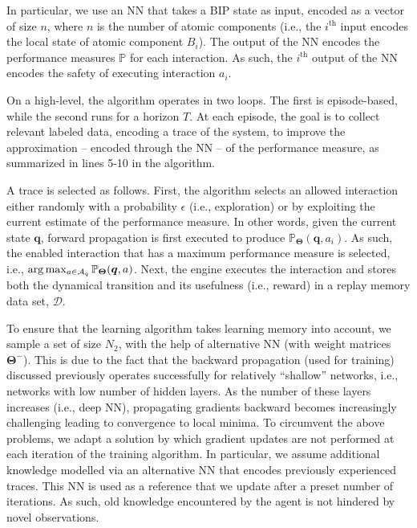 In particular, we use an NN that takes a BIP state as input, encoded as a vector of size $n$, where $n$ is the number of atomic components (i.e., the $i^{\text{th}}$ input encodes the local state of atomic component $B_i$). The output of the NN encodes the performance measures $\mathbb{P}$ for each interaction. As such, the $i^{\text{th}}$ output of the NN encodes the safety of executing interaction $a_i$.  

On a high-level, the algorithm operates in two loops. The first is episode-based, while the second runs for a horizon $T$. At each episode, the goal is to collect relevant labeled data, encoding a trace of the system, to improve the approximation -- encoded through the NN -- of the performance measure, as summarized in lines 5-10 in the algorithm. 

A trace is selected as follows. First, the algorithm selects an allowed interaction either randomly with a probability $\epsilon$ (i.e., exploration) or by exploiting the current estimate of the performance measure. In other words, given the current state $ \bm{q}$, forward propagation is first executed to produce  $\mathbb{P}_{\bm{\Theta}}( \bm{q},a_i)$. As such, the enabled interaction that has a maximum performance measure is selected, i.e., $\arg\max_{a\in {\cal A}_q} \mathbb{P}_{\bm{\Theta}}( \bm{q},a)$. 
Next, the engine executes the interaction and stores both the dynamical transition and its usefulness (i.e., reward) in a replay memory data set, $\mathcal{D}$. 

To ensure that the learning algorithm takes learning memory into account, we sample a set of size $N_{2}$, with the help of alternative NN (with weight matrices $\bm{\Theta}^{-}$). This is due to the fact that the backward propagation (used for training) discussed previously operates successfully for relatively ``shallow'' networks, i.e., networks with low number of hidden layers. As the number of these layers increases (i.e., deep NN), propagating gradients backward becomes increasingly challenging leading to convergence to local minima. To circumvent the above problems, we adapt a solution by which gradient updates are not performed at each iteration of the training algorithm. In particular, we assume additional knowledge modelled via an alternative NN that encodes previously experienced traces. This NN is used as a reference that we update after a preset number of iterations. As such, old knowledge encountered by the agent is not hindered by novel observations. 

